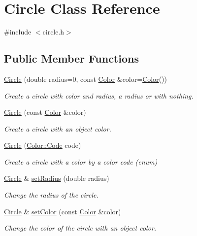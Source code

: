 \hypertarget{classCircle}{}\section{Circle Class Reference}
\label{classCircle}


{\ttfamily \#include $<$circle.\+h$>$}

\subsection*{Public Member Functions}
\begin{DoxyCompactItemize}
\item 
\hyperlink{classCircle_a47da8474569bafdf019ff4063a69bc0c}{Circle} (double radius=0, const \hyperlink{classColor}{Color} \&color=\hyperlink{classColor}{Color}())
\begin{DoxyCompactList}\small\item\em Create a circle with color and radius, a radius or with nothing. \end{DoxyCompactList}\item 
\hyperlink{classCircle_a5717f409ec880455c624c66e6d72986d}{Circle} (const \hyperlink{classColor}{Color} \&color)
\begin{DoxyCompactList}\small\item\em Create a circle with an object color. \end{DoxyCompactList}\item 
\hyperlink{classCircle_a3a467448cf897cd57b6037c8e94578c7}{Circle} (\hyperlink{classColor_a20a7b04657c1d83fae5d54514d3f1622}{Color\+::\+Code} code)
\begin{DoxyCompactList}\small\item\em Create a circle with a color by a color code (enum) \end{DoxyCompactList}\item 
\hyperlink{classCircle}{Circle} \& \hyperlink{classCircle_a4c92fd2f5e3149d9d5b5d1a4ce4773fc}{set\+Radius} (double radius)
\begin{DoxyCompactList}\small\item\em Change the radius of the circle. \end{DoxyCompactList}\item 
\hyperlink{classCircle}{Circle} \& \hyperlink{classCircle_a7e0039e4c56e5f4c5e26aa56c72a17f5}{set\+Color} (const \hyperlink{classColor}{Color} \&color)
\begin{DoxyCompactList}\small\item\em Change the color of the circle with an object color. \end{DoxyCompactList}\item 

\end{DoxyCompactItemize}
